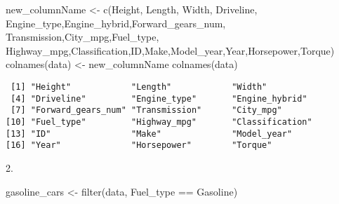 \documentclass[
  letterpaper,
  DIV=11,
  numbers=noendperiod]{scrartcl}
\newenvironment{Shaded}{\begin{snugshade}}{\end{snugshade}}
\newcommand{\FunctionTok}[1]{\textcolor[rgb]{0.28,0.35,0.67}{#1}}
\newcommand{\NormalTok}[1]{\textcolor[rgb]{0.00,0.23,0.31}{#1}}
\newcommand{\OtherTok}[1]{\textcolor[rgb]{0.00,0.23,0.31}{#1}}
\newcommand{\SpecialCharTok}[1]{\textcolor[rgb]{0.37,0.37,0.37}{#1}}
\newcommand{\StringTok}[1]{\textcolor[rgb]{0.13,0.47,0.30}{#1}}
\begin{document}
\begin{Shaded}
\begin{Highlighting}[]
\NormalTok{new\_columnName }\OtherTok{\textless{}{-}} \FunctionTok{c}\NormalTok{(}\StringTok{\textquotesingle{}Height\textquotesingle{}}\NormalTok{, }\StringTok{\textquotesingle{}Length\textquotesingle{}}\NormalTok{, }\StringTok{\textquotesingle{}Width\textquotesingle{}}\NormalTok{, }\StringTok{\textquotesingle{}Driveline\textquotesingle{}}\NormalTok{, }\StringTok{\textquotesingle{}Engine\_type\textquotesingle{}}\NormalTok{,}\StringTok{\textquotesingle{}Engine\_hybrid\textquotesingle{}}\NormalTok{,}\StringTok{\textquotesingle{}Forward\_gears\_num\textquotesingle{}}\NormalTok{, }\StringTok{\textquotesingle{}Transmission\textquotesingle{}}\NormalTok{,}\StringTok{\textquotesingle{}City\_mpg\textquotesingle{}}\NormalTok{,}\StringTok{\textquotesingle{}Fuel\_type\textquotesingle{}}\NormalTok{, }\StringTok{\textquotesingle{}Highway\_mpg\textquotesingle{}}\NormalTok{,}\StringTok{\textquotesingle{}Classification\textquotesingle{}}\NormalTok{,}\StringTok{\textquotesingle{}ID\textquotesingle{}}\NormalTok{,}\StringTok{\textquotesingle{}Make\textquotesingle{}}\NormalTok{,}\StringTok{\textquotesingle{}Model\_year\textquotesingle{}}\NormalTok{,}\StringTok{\textquotesingle{}Year\textquotesingle{}}\NormalTok{,}\StringTok{\textquotesingle{}Horsepower\textquotesingle{}}\NormalTok{,}\StringTok{\textquotesingle{}Torque\textquotesingle{}}\NormalTok{)}
\FunctionTok{colnames}\NormalTok{(data) }\OtherTok{\textless{}{-}}\NormalTok{ new\_columnName}
\FunctionTok{colnames}\NormalTok{(data)}
\end{Highlighting}
\end{Shaded}

\begin{verbatim}
 [1] "Height"            "Length"            "Width"            
 [4] "Driveline"         "Engine_type"       "Engine_hybrid"    
 [7] "Forward_gears_num" "Transmission"      "City_mpg"         
[10] "Fuel_type"         "Highway_mpg"       "Classification"   
[13] "ID"                "Make"              "Model_year"       
[16] "Year"              "Horsepower"        "Torque"           
\end{verbatim}

2.

\begin{Shaded}
\begin{Highlighting}[]
\NormalTok{gasoline\_cars }\OtherTok{\textless{}{-}} \FunctionTok{filter}\NormalTok{(data, Fuel\_type }\SpecialCharTok{==} \StringTok{\textquotesingle{}Gasoline\textquotesingle{}}\NormalTok{)}
\end{Highlighting}
\end{Shaded}
\end{document}
